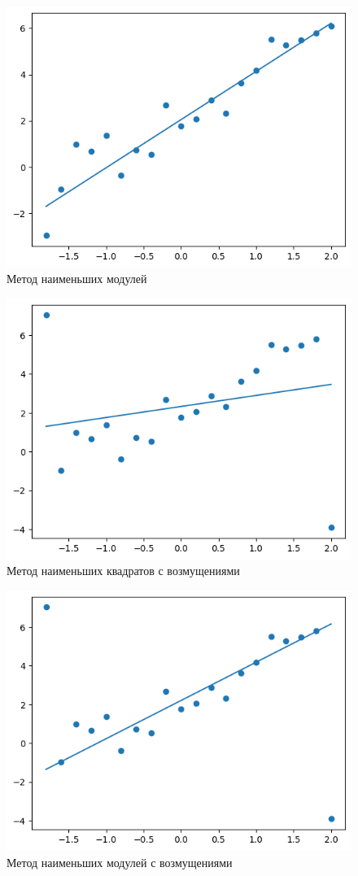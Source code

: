 \documentclass[12pt,a4paper]{article}
\begin{document}
	\begin{figure}[htbp!]
		\begin{center}
			\includegraphics[width = 0.75\linewidth]{graphics/lab6_abs}
			\caption{Метод наименьших модулей}
		\end{center}
	\end{figure}

	\begin{figure}[htbp!]
		\begin{center}
			\includegraphics[width = 0.75\linewidth]{graphics/lab6_sq_mod}
			\caption{Метод наименьших квадратов с возмущениями}
		\end{center}
	\end{figure}

	\begin{figure}[htbp!]
		\begin{center}
			\includegraphics[width = 0.75\linewidth]{graphics/lab6_abs_mod}
			\caption{Метод наименьших модулей с возмущениями}
		\end{center}
	\end{figure}
\end{document}
